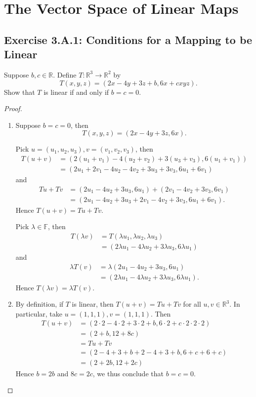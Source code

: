 \chapter{The Vector Space of Linear Maps}
\section{Exercise 3.A.1: Conditions for a Mapping to be Linear}
Suppose $b,c\in\mathbb{R}$. Define $T:\mathbb{R}^3\to\mathbb{R}^2$ by\[
T(x,y,z)=(2x-4y+3z+b,6x+cxyz).
\]Show that $T$ is linear if and only if $b=c=0$.
\begin{proof}
\begin{enumerate}
\item Suppose $b=c=0$, then\[
T(x,y,z)=(2x-4y+3z,6x).
\]

Pick $u=(u_1,u_2,u_3),v=(v_1,v_2,v_3)$, then\[
\begin{split}
T(u+v)&=(2(u_1+v_1)-4(u_2+v_2)+3(u_3+v_3),6(u_1+v_1))\\
&=(2u_1+2v_1-4u_2-4v_2+3u_3+3v_3,6u_1+6v_1)
\end{split}
\]and\[
\begin{split}
Tu+Tv&=(2u_1-4u_2+3u_3,6u_1)+(2v_1-4v_2+3v_3,6v_1)\\
&=(2u_1-4u_2+3u_3+2v_1-4v_2+3v_3,6u_1+6v_1).
\end{split}
\]Hence $T(u+v)=Tu+Tv$.

Pick $\lambda\in\mathbb{F}$, then\[
\begin{split}
T(\lambda v)&=T(\lambda u_1,\lambda u_2,\lambda u_3)\\
&=(2\lambda u_1-4\lambda u_2+3\lambda u_3,6\lambda u_1)
\end{split}
\]and\[
\begin{split}
\lambda T(v)&=\lambda(2u_1-4u_2+3u_3,6u_1)\\
&=(2\lambda u_1-4\lambda u_2+3\lambda u_3,6\lambda u_1).
\end{split}
\]Hence $T(\lambda v)=\lambda T(v)$.

\item By definition, if $T$ is linear, then $T(u+v)=Tu+Tv$ for all $u,v\in\mathbb{R}^3$. In particular, take $u=(1,1,1),v=(1,1,1)$. Then\[
\begin{split}
T(u+v)&=(2\cdot 2-4\cdot 2+3\cdot 2+b,6\cdot 2+c\cdot 2\cdot 2\cdot 2)\\
&=(2+b,12+8c)\\
&=Tu+Tv\\
&=(2-4+3+b+2-4+3+b,6+c+6+c)\\
&=(2+2b,12+2c)
\end{split}
\]Hence $b=2b$ and $8c=2c$, we thus conclude that $b=c=0$.
\end{enumerate}
\end{proof}

